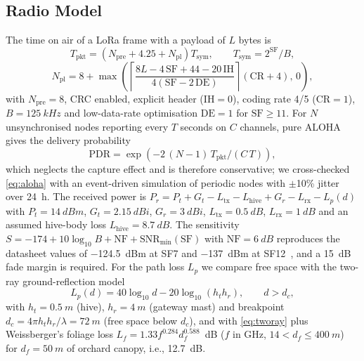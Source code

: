 \documentclass[conference]{IEEEtran}
\begin{document}
\subsection{Radio Model}\label{sec:m-radio}
The time on air of a LoRa frame with a payload of $L$ bytes is~\cite{semtech2013an}
\begin{equation}
T_\mathrm{pkt} = \left(N_\mathrm{pre} + 4.25 + N_\mathrm{pl}\right) T_\mathrm{sym},\qquad T_\mathrm{sym} = 2^{\mathrm{SF}}/B,
\label{eq:toa}
\end{equation}
\begin{equation}
N_\mathrm{pl} = 8 + \max\!\left(\left\lceil \frac{8L - 4\,\mathrm{SF} + 44 - 20\,\mathrm{IH}}{4(\mathrm{SF} - 2\,\mathrm{DE})} \right\rceil (\mathrm{CR}+4),\,0\right),
\label{eq:npl}
\end{equation}
with $N_\mathrm{pre} = 8$, CRC enabled, explicit header ($\mathrm{IH}=0$), coding rate 4/5 ($\mathrm{CR}=1$), $B = \SI{125}{kHz}$ and low-data-rate optimisation $\mathrm{DE}=1$ for $\mathrm{SF}\geq 11$. For $N$ unsynchronised nodes reporting every $T$ seconds on $C$ channels, pure ALOHA~\cite{abramson1970} gives the delivery probability
\begin{equation}
\mathrm{PDR} = \exp\!\left(-2\,(N-1)\,T_\mathrm{pkt}/(C\,T)\right),
\label{eq:aloha}
\end{equation}
which neglects the capture effect and is therefore conservative; we cross-checked \eqref{eq:aloha} with an event-driven simulation of periodic nodes with $\pm$10\% jitter over \SI{24}{h}. The received power is $P_r = P_t + G_t - L_\mathrm{tx} - L_\mathrm{hive} + G_r - L_\mathrm{rx} - L_p(d)$ with $P_t = \SI{14}{dBm}$, $G_t = \SI{2.15}{dBi}$, $G_r = \SI{3}{dBi}$, $L_\mathrm{tx} = \SI{0.5}{dB}$, $L_\mathrm{rx} = \SI{1}{dB}$ and an assumed hive-body loss $L_\mathrm{hive} = \SI{8.7}{dB}$. The sensitivity $S = -174 + 10\log_{10}B + \mathrm{NF} + \mathrm{SNR}_\mathrm{min}(\mathrm{SF})$ with $\mathrm{NF} = \SI{6}{dB}$ reproduces the datasheet values of \SI{-124.5}{dBm} at SF7 and \SI{-137}{dBm} at SF12~\cite{sx1262ds}, and a \SI{15}{dB} fade margin is required. For the path loss $L_p$ we compare free space with the two-ray ground-reflection model~\cite{rappaport2002}
\begin{equation}
L_p(d) = 40\log_{10} d - 20\log_{10} (h_t h_r), \qquad d > d_c,
\label{eq:tworay}
\end{equation}
with $h_t = \SI{0.5}{m}$ (hive), $h_r = \SI{4}{m}$ (gateway mast) and breakpoint $d_c = 4\pi h_t h_r/\lambda = \SI{72}{m}$ (free space below $d_c$), and with \eqref{eq:tworay} plus Weissberger's foliage loss $L_f = 1.33 f^{0.284} d_f^{0.588}$~dB ($f$ in GHz, $14 < d_f \le \SI{400}{m}$)~\cite{weissberger1982,itur833} for $d_f = \SI{50}{m}$ of orchard canopy, i.e., \SI{12.7}{dB}.
\end{document}
